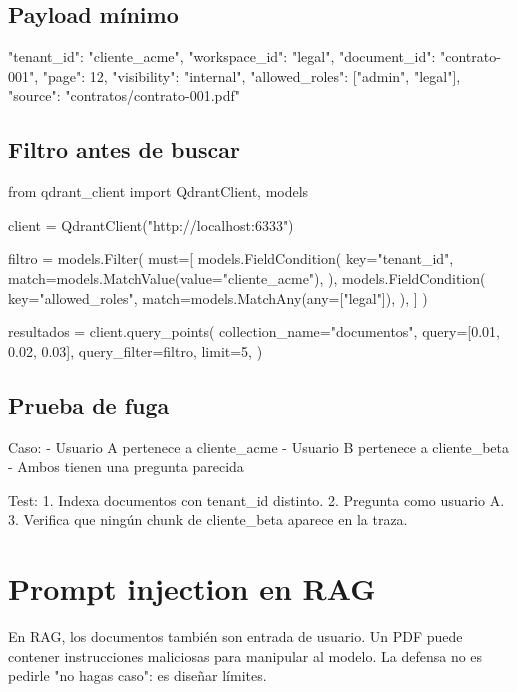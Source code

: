 \documentclass[11pt,a4paper]{book}
\begin{document}
\section{Payload mínimo}
\begin{codebox}
{
  "tenant_id": "cliente_acme",
  "workspace_id": "legal",
  "document_id": "contrato-001",
  "page": 12,
  "visibility": "internal",
  "allowed_roles": ["admin", "legal"],
  "source": "contratos/contrato-001.pdf"
}
\end{codebox}
\section{Filtro antes de buscar}
\begin{codebox}
from qdrant_client import QdrantClient, models

client = QdrantClient("http://localhost:6333")

filtro = models.Filter(
    must=[
        models.FieldCondition(
            key="tenant_id",
            match=models.MatchValue(value="cliente_acme"),
        ),
        models.FieldCondition(
            key="allowed_roles",
            match=models.MatchAny(any=["legal"]),
        ),
    ]
)

resultados = client.query_points(
    collection_name="documentos",
    query=[0.01, 0.02, 0.03],
    query_filter=filtro,
    limit=5,
)
\end{codebox}
\section{Prueba de fuga}
\begin{codebox}
Caso:
- Usuario A pertenece a cliente_acme
- Usuario B pertenece a cliente_beta
- Ambos tienen una pregunta parecida

Test:
1. Indexa documentos con tenant_id distinto.
2. Pregunta como usuario A.
3. Verifica que ningún chunk de cliente_beta aparece en la traza.
\end{codebox}
\chapter{Prompt injection en RAG}
En RAG, los documentos también son entrada de usuario. Un PDF puede contener instrucciones maliciosas para manipular al modelo. La defensa no es pedirle "no hagas caso": es diseñar límites.
\end{document}
